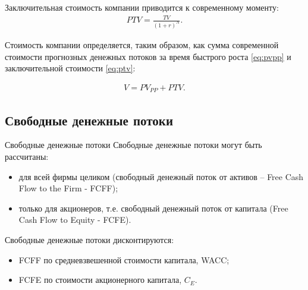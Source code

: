 \documentclass[_Venture_p2.tex]{subfiles}
\begin{document}
\begin{frame}
	Заключительная стоимость компании приводится к современному моменту:
	\begin{align}\label{eq:ptv}
	PTV=\frac{TV}{(1+r)^N}.
	\end{align}
\end{frame}

\begin{frame}
Стоимость компании определяется, таким образом, как сумма современной стоимости прогнозных денежных потоков за время быстрого роста \ref{eq:pvpp} и заключительной стоимости \ref{eq:ptv}:

\begin{align}\label{eq:v}
V=PV_{PP}+PTV.
\end{align}

\end{frame}

\subsection{Свободные денежные потоки}
\begin{frame}[allowframebreaks]{Свободные денежные потоки }{}
Свободные денежные потоки могут быть рассчитаны:
\begin{itemize}
	\item для всей фирмы целиком (свободный денежный поток от активов – Free Cash Flow to the Firm - FCFF); 
	\item только для акционеров, т.е. свободный денежный поток от капитала (Free Cash Flow to Equity - FCFE).
\end{itemize}

\pagebreak
Свободные денежные потоки дисконтируются:
\begin{itemize}
	\item FCFF по средневзвешенной стоимости капитала, WACC;
	\item FCFE по стоимости акционерного капитала, $C_E$. 
\end{itemize}
\end{frame}
\end{document}
